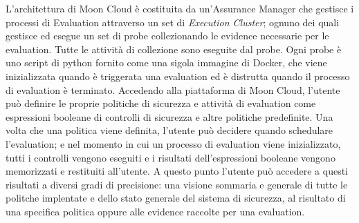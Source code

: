 L'architettura di Moon Cloud è costituita da un'Assurance Manager che gestisce i processi di Evaluation attraverso un set di 
\textit{Execution Cluster}; ognuno dei quali gestisce ed esegue un set di probe collezionando le evidence necessarie per le evaluation.
Tutte le attività di collezione sono eseguite dal probe. Ogni probe è uno script di python fornito come una sigola immagine di Docker, 
che viene inizializzata quando è triggerata una evaluation ed è distrutta quando il processo di evaluation è terminato.
\newline
Accedendo alla piattaforma di Moon Cloud, l'utente può definire le proprie politiche di sicurezza e attività di evaluation come 
espressioni booleane di controlli di sicurezza e altre politiche predefinite. Una volta che una politica viene definita, l'utente può 
decidere quando schedulare l'evaluation; e nel momento in cui un processo di evaluation viene inizializzato, tutti i controlli vengono 
eseguiti e i risultati dell'espressioni booleane vengono memorizzati e restituiti all'utente. A questo punto l'utente può accedere a 
questi risultati a diversi gradi di precisione: una visione sommaria e generale di tutte le politche implentate e dello stato generale 
del sistema di sicurezza, al risultato di una specifica politica oppure alle evidence raccolte per una evaluation.
